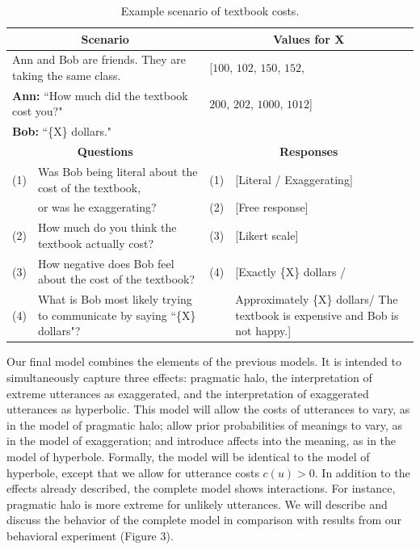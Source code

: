 \documentclass{article} %
\begin{document}
\begin{table}[h]
\begin{tabular}{| p{0.15cm}  p{8.15cm}| p{0.15cm}p{4cm} |}\hline
\multicolumn{2}{|c|}{\textbf{Scenario}} & \multicolumn{2}{c|}{\textbf{Values for X}} \\\hline
\multicolumn{2}{|l|}{Ann and Bob are friends. They are taking the same class.} & \multicolumn{2}{l|}{[$100$, $102$, $150$, $152$,}\\
\multicolumn{2}{|l|}{\textbf{Ann:} ``How much did the textbook cost you?"} & \multicolumn{2}{l|}{$200$, $202$, $1000$, $1012$]}\\
\multicolumn{2}{|l|}{\textbf{Bob:} ``\{X\} dollars."} & \multicolumn{2}{l|}{}\\\hline
\multicolumn{2}{|c|}{\textbf{Questions}} & \multicolumn{2}{c|}{\textbf{Responses}} \\\hline
(1) & Was Bob being literal about the cost of the textbook, & (1) &[Literal / Exaggerating] \\
 & or was he exaggerating? & (2) & [Free response] \\
(2) & How much do you think the textbook actually cost? & (3) & [Likert scale] \\
(3) & How negative does Bob feel about the cost of the textbook? & (4) & [Exactly \{X\} dollars / \\
(4) & What is Bob most likely trying to communicate by saying  ``\{X\} dollars"? & & Approximately \{X\} dollars/ The textbook is expensive and Bob is not happy.]\\\hline
\end{tabular}
\caption{Example scenario of textbook costs.}
\label{tab:myfirsttable}
\end{table}


Our final model combines the elements of the previous models. It is intended to simultaneously capture three effects: pragmatic halo, the interpretation of extreme utterances as exaggerated, and the interpretation of exaggerated utterances as hyperbolic. This model will allow the costs of utterances to vary, as in the model of pragmatic halo; allow prior probabilities of meanings to vary, as in the model of exaggeration; and introduce affects into the meaning, as in the model of hyperbole. Formally, the model will be identical to the model of hyperbole, except that we allow for utterance costs $c(u) > 0$. In addition to the effects already described, the complete model shows interactions. For instance, pragmatic halo is more extreme for unlikely utterances. We will describe and discuss the behavior of the complete model in comparison with results from our behavioral experiment (Figure 3).
\end{document}
